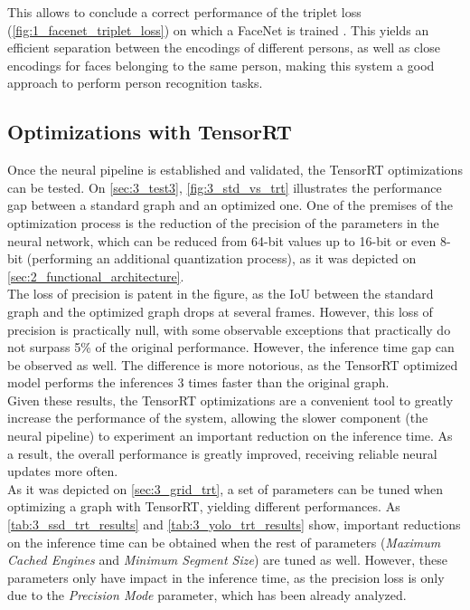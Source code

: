 This allows to conclude a correct performance of the triplet loss (\autoref{fig:1_facenet_triplet_loss}) on which a FaceNet is trained \cite{facenet}. This yields an efficient separation between the encodings of different persons, as well as close encodings for faces belonging to the same person, making this system a good approach to perform person recognition tasks.\\


\subsection{Optimizations with TensorRT}

Once the neural pipeline is established and validated, the TensorRT optimizations can be tested. On \autoref{sec:3_test3}, \autoref{fig:3_std_vs_trt} illustrates the performance gap between a standard graph and an optimized one. One of the premises of the optimization process is the reduction of the precision of the parameters in the neural network, which can be reduced from 64-bit values up to 16-bit or even 8-bit (performing an additional quantization process), as it was depicted on \autoref{sec:2_functional_architecture}.\\

The loss of precision is patent in the figure, as the IoU between the standard graph and the optimized graph drops at several frames. However, this loss of precision is practically null, with some observable exceptions that practically do not surpass 5\% of the original performance. However, the inference time gap can be observed as well. The difference is more notorious, as the TensorRT optimized model performs the inferences 3 times faster than the original graph.\\

Given these results, the TensorRT optimizations are a convenient tool to greatly increase the performance of the system, allowing the slower component (the neural pipeline) to experiment an important reduction on the inference time. As a result, the overall performance is greatly improved, receiving reliable neural updates more often.\\

As it was depicted on \autoref{sec:3_grid_trt}, a set of parameters can be tuned when optimizing a graph with TensorRT, yielding different performances. As \autoref{tab:3_ssd_trt_results} and \autoref{tab:3_yolo_trt_results} show, important reductions on the inference time can be obtained when the rest of parameters (\textit{Maximum Cached Engines} and \textit{Minimum Segment Size}) are tuned as well. However, these parameters only have impact in the inference time, as the precision loss is only due to the \textit{Precision Mode} parameter, which has been already analyzed.\\

